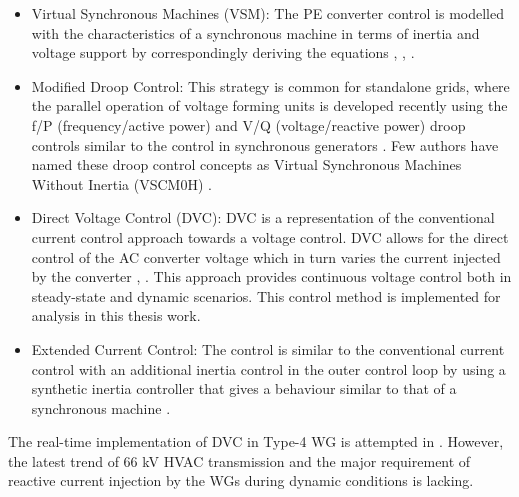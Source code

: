 
\begin{itemize}
    \item Virtual Synchronous Machines (VSM): The \gls{PE} converter control is modelled with the characteristics of a synchronous machine in terms of inertia and voltage support by correspondingly deriving the equations \cite{markovic2018lqr}, \cite{duckwitz_operating_behavior}, \cite{lu_virtual_2019}.
    
    \item Modified Droop Control:
    This strategy is common for standalone grids, where the parallel operation of voltage forming units is developed recently using the f/P (frequency/active power) and V/Q (voltage/reactive power) droop controls similar to the control in synchronous generators \cite{bouzid2016simulation}. Few authors have named these droop control concepts as Virtual Synchronous Machines Without Inertia (VSCM0H) \cite{yu2016use}.
    
    \item Direct Voltage Control (\gls{DVC}):
    \gls{DVC} is a representation of the conventional current control approach towards a voltage control. \gls{DVC} allows for the direct control of the \gls{AC} converter voltage which in turn varies the current injected by the converter  \cite{korai_dynamic_2019}, \cite{erlich_new_2017}. This approach provides continuous voltage control both in steady-state and dynamic scenarios. This control method is implemented for analysis in this thesis work.
    
    \item Extended Current Control:
    The control is similar to the conventional current control with an additional inertia control in the outer control loop by using a synthetic inertia controller that gives a behaviour similar to that of a synchronous machine \cite{duckwitz_derivation_2019} \cite{liu2017control}. 
\end{itemize}

The real-time implementation of \gls{DVC} in Type-4 \gls{WG} is attempted in \cite{sethi_real-time_nodate-new}. However, the latest trend of 66 kV \gls{HVAC} transmission and the major requirement of reactive current injection by the \gls{WG}s during dynamic conditions is lacking.
 

